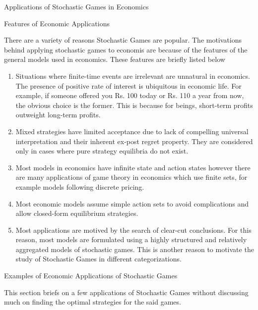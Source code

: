 \documentclass{article}
\begin{document}
\begin{psection}{Applications of Stochastic Games in Economics}

	\begin{psubsection}{Features of Economic Applications}

		There are a variety of reasons Stochastic Games are popular. The motivations behind applying stochastic games to economis are because of the features of the general models used in economics. These features are briefly listed below \citep{economic}
		\begin{enumerate}
			\item {} Situations where finite-time events are irrelevant are unnatural in economics. The presence of positive rate of interest is ubiquitous in economic life. For example, if someone offered you Rs. 100 today or Rs. 110 a year from now, the obvious choice is the former. This is because for beings, short-term profits outweight long-term profits.
			\item {} Mixed strategies have limited acceptance due to lack of compelling universal interpretation and their inherent ex-post regret property. They are considered only in cases where pure strategy equilibria do not exist.
			\item {} Most models in economics have infinite state and action states however there are many applications of game theory in economics which use finite sets, for example models following discrete pricing.
			\item {} Most economic models assume simple action sets to avoid complications and allow closed-form equilibrium strategies.
			\item {} Most applications are motived by the search of clear-cut conclusions. For this reason, most models are formulated using a highly structured and relatively aggregated models of stochastic games. This is another reason to motivate the study of Stochastic Games in different categorizations.
		\end{enumerate}

	\end{psubsection}

	\begin{psubsection}{Examples of Economic Applications of Stochastic Games}

		This section briefs on a few applications of Stochastic Games without discussing much on finding the optimal strategies for the said games.


\end{psubsection}
\end{psection}
\end{document}
